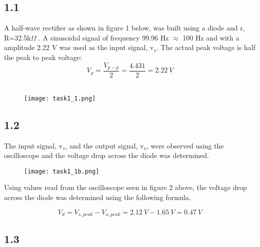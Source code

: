 \subsection*{1.1}

    A half-wave rectifier as shown in figure 1 below, was built using a  diode and r, R=32.5k$\Omega$ .
    A sinusoidal signal of frequency 99.96 Hz $\approx $ 100 Hz and with a amplitude 2.22 V was used as the input signal, v$_s$. The actual peak voltage is half the peak to peak voltage: $$ V_p = \dfrac{V_{p-p}}{2} = \dfrac{4.431}{2} = 2.22 \ V$$ \\

    \begin{figure}[h!]
        \centering
        \texttt{[image: task1\_1.png]}
    \end{figure}

\subsection*{1.2}

    The input signal, v$_s$, and the output signal, v$_o$, were observed using the oscilloscope and the voltage drop across the diode was determined.\\

    \begin{figure}[h!]
        \centering
        \texttt{[image: task1\_1b.png]}
    \end{figure}

    Using values read from the oscilloscope seen in figure 2 above, the voltage drop across the diode was determined using the following formula.

    $$V_d = V_{s,peak} - V_{o,peak} = 2.12 \ V - 1.65 \ V = 0.47 \ V$$

\subsection*{1.3}

